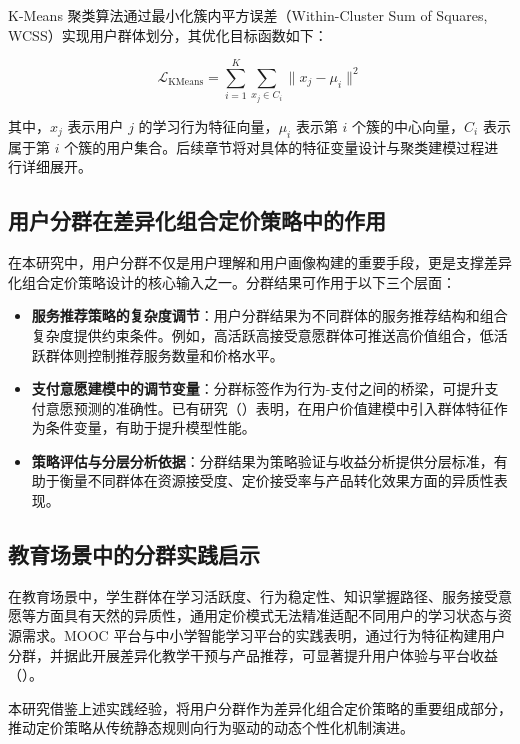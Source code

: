 K-Means 聚类算法通过最小化簇内平方误差（Within-Cluster Sum of Squares, WCSS）实现用户群体划分，其优化目标函数如下：

\begin{equation}
\mathcal{L}_{\text{KMeans}} = \sum_{i=1}^{K} \sum_{x_j \in C_i} \| x_j - \mu_i \|^2
\end{equation}

其中，$x_j$ 表示用户 $j$ 的学习行为特征向量，$\mu_i$ 表示第 $i$ 个簇的中心向量，$C_i$ 表示属于第 $i$ 个簇的用户集合。后续章节将对具体的特征变量设计与聚类建模过程进行详细展开。

\subsection{用户分群在差异化组合定价策略中的作用}

在本研究中，用户分群不仅是用户理解和用户画像构建的重要手段，更是支撑差异化组合定价策略设计的核心输入之一。分群结果可作用于以下三个层面：

\begin{itemize}
  \item \textbf{服务推荐策略的复杂度调节}：用户分群结果为不同群体的服务推荐结构和组合复杂度提供约束条件。例如，高活跃高接受意愿群体可推送高价值组合，低活跃群体则控制推荐服务数量和价格水平。
  \item \textbf{支付意愿建模中的调节变量}：分群标签作为行为-支付之间的桥梁，可提升支付意愿预测的准确性。已有研究（\cite{choi2021priceacceptance}）表明，在用户价值建模中引入群体特征作为条件变量，有助于提升模型性能。
  \item \textbf{策略评估与分层分析依据}：分群结果为策略验证与收益分析提供分层标准，有助于衡量不同群体在资源接受度、定价接受率与产品转化效果方面的异质性表现。
\end{itemize}

\subsection{教育场景中的分群实践启示}

在教育场景中，学生群体在学习活跃度、行为稳定性、知识掌握路径、服务接受意愿等方面具有天然的异质性，通用定价模式无法精准适配不同用户的学习状态与资源需求。MOOC 平台与中小学智能学习平台的实践表明，通过行为特征构建用户分群，并据此开展差异化教学干预与产品推荐，可显著提升用户体验与平台收益（\cite{sun2021moocpricing}）。

本研究借鉴上述实践经验，将用户分群作为差异化组合定价策略的重要组成部分，推动定价策略从传统静态规则向行为驱动的动态个性化机制演进。

